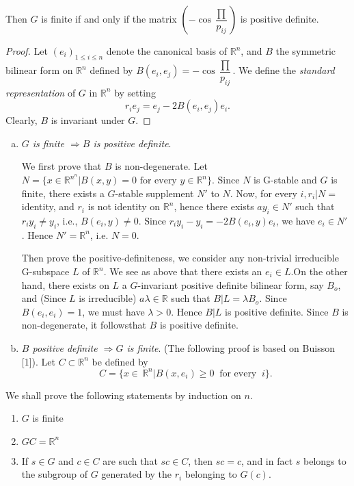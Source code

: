 Then $G$ is finite if and only if the matrix $\left(- \cos
\dfrac{\prod}{p_{ij}}\right)$ is positive definite. 

\begin{proof}
  Let $(e_i)_{1 \le i \le n}$ denote the canonical basis of
  $\mathbb{R}^n$, and $B$  the symmetric bilinear form on $\mathbb{R}^n$
  defined  by $B(e_i, e_j)=- \cos \dfrac{\prod}{p_{ij}}$. We  define the
  \textit{standard representation} of $G$ in $\mathbb{R}^n$ by setting 
  $$
  r_i e_j= e_j - 2B(e_i,e_j)e_i.
  $$
  Clearly, $B$ is invariant under $G$.
\end{proof}  

\begin{enumerate}[a)]
\item \textit{$G$ is finite  $\Rightarrow B$ is positive definite}.
  
  We first prove that $B$  is non-degenerate. Let $N= \bigg\{ x \in
  \mathbb{R}^{n^n} |B(x,y)=0 \text{ for every } y \in
  \mathbb{R}^n\bigg\}$. Since $N$ is G-stable  and $G$ is finite,
  there exists a $G$-stable supplement $N'$ to $N$. Now, for every $i,
  r_i|N=$ identity, and $r_i$ is not identity on $\mathbb{R}^n$, hence
  there exists $a y_i \in N'$ such that $r_i y_i \neq y_i$,
  i.e., $B(e_i, y) \neq 0$. Since $r_i y_i -y_i=- 2B(e_i,y)e_i$, we
  have $e_i \in N'$. Hence $N'  = \mathbb{R}^n$, i.e. $N=0$. 
  
  Then prove the positive-definiteness, we consider any non-trivial
  irreducible G-subspace $L$ of $\mathbb{R}^n$. We see as above that
  there  exists an $e_i \in L$.On the other hand, there exists on $L$
  a $G$-invariant positive definite bilinear form, say $B_o$, and
  (Since  $L$  is irreducible) $a \lambda \in \mathbb{R}$ such that
  $B|L= \lambda B_o$. Since $B(e_i, e_i)=1$, we must have $\lambda >
  0$. Hence $B|L$ is positive definite. Since $B$  is non-degenerate,
  it follows\pageoriginale  that $B$ is positive definite. 

\item \textit{$B$ positive definite $\Rightarrow G$ is finite}.  (The
  following proof is based on Buisson [1]). Let $C \subset
  \mathbb{R}^n$ be defined by 
  $$
  C =\bigg\{x \in  \,\mathbb{R}^n \big| B(x,e_i) \ge 0 ~\text{ for
    every }~ i \bigg\}. 
  $$
\end{enumerate}

We shall prove the following  statements by induction on $n$. 
\begin{enumerate}[1)]
\item $G$ is finite
\item $GC= \mathbb{R}^n$
\item If $s \in G$ and $c \in C$ are such that $sc \in C$, then
  $sc=c$, and in fact $s$ belongs to the subgroup of $G$ generated by
  the $r_i$  belonging to $G(c)$. 
\end{enumerate}     

